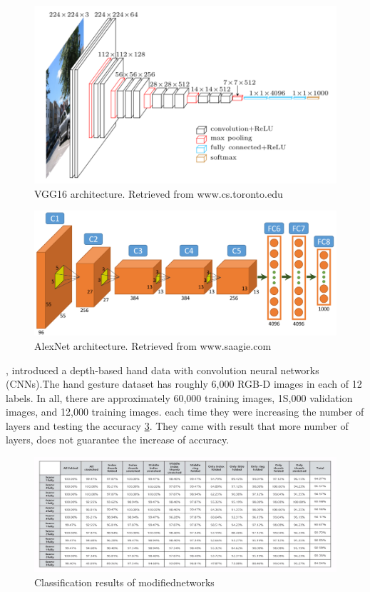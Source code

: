 \documentclass[12pt]{report}
\begin{document}
\begin{figure}[h]
    \centering
    \includegraphics[width=.9\textwidth]{images/vgg16.png}
    \caption{VGG16 architecture. Retrieved from www.cs.toronto.edu}
    \label{fig:vgg16}
\end{figure}
\begin{figure}[h]
    \centering
    \includegraphics[width=.8\textwidth]{images/alexnet.png}
    \caption{AlexNet architecture. Retrieved from www.saagie.com}
    \label{fig:alexnet}
\end{figure}


\clearpage

\cite{Pyo2016}, introduced a depth-based hand data with convolution
neural networks (CNNs).The hand gesture dataset has roughly 6,000 RGB-D images in
each of 12 labels. In all, there are approximately 60,000
training images, 1S,000 validation images, and 12,000 training images.
each time they were increasing the number of layers and testing the accuracy \ref{fig:depth_cnn}.
They came with result that more number of layers, does not guarantee the increase of accuracy.
\bigbreak

\begin{figure}[h]
    \centering
    \includegraphics[width=\textwidth]{images/depth_cnn.png}
    \caption{Classification results of  modifiednetworks}
    \label{fig:depth_cnn}
\end{figure}
\end{document}
